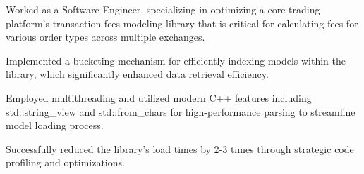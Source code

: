\begin{cvitemize}
\item Worked as a Software Engineer, specializing in optimizing a core trading platform’s transaction fees modeling library that is critical for calculating fees for various order types across multiple exchanges.
\item Implemented a bucketing mechanism for efficiently indexing models within the library, which significantly enhanced data retrieval efficiency.
\item Employed multithreading and utilized modern C++ features including std::string\_view and std::from\_chars for high-performance parsing to streamline model loading process.
\item Successfully reduced the library's load times by 2-3 times through strategic code profiling and optimizations.
\end{cvitemize}